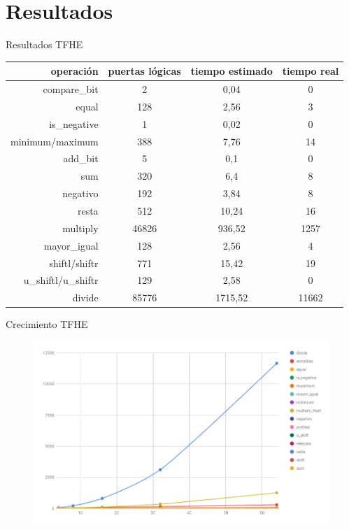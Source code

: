 \documentclass{beamer}
\begin{document}
\section{Resultados}

\begin{frame}{Resultados TFHE}
    \begin{table}[]
        \centering
        \begin{tabular}{ r | ccc }
            operación       & puertas lógicas       & tiempo estimado & tiempo real \\
            \hline \hline
            compare\_bit     & 2     & 0,04 & 0 \\
            equal   & 128   & 2,56  & 3 \\
            is\_negative     & 1     & 0,02 & 0 \\
            minimum/maximum & 388   & 7,76  & 14  \\
            add\_bit    & 5     & 0,1  & 0 \\
            sum     & 320   & 6,4 & 8 \\
            negativo        & 192   & 3,84  & 8 \\
            resta   & 512   & 10,24 & 16  \\
            multiply        & 46826 & 936,52  & 1257  \\
            mayor\_igual     & 128   & 2,56 & 4 \\
            shiftl/shiftr   & 771   & 15,42 & 19  \\
            u\_shiftl/u\_shiftr       & 129   & 2,58  & 0 \\
            divide  & 85776 & 1715,52 & 11662
        \end{tabular}
    \end{table}
\end{frame}

\begin{frame}{Crecimiento TFHE}
    \begin{figure}[H]
        \centering\includegraphics[width=\textwidth]{crec_func}
    \end{figure}
\end{frame}
\end{document}

